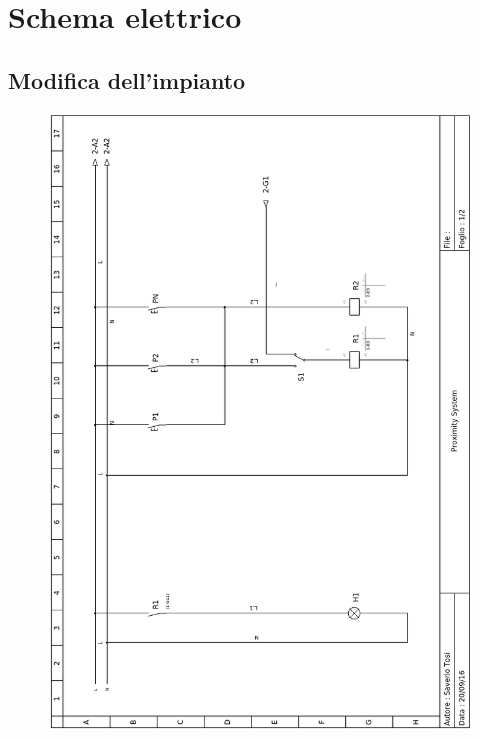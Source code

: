\chapter{Schema elettrico}
\section{Modifica dell'impianto}
\begin{figure}
\centering
\includegraphics[scale=0.57]{Immagini/schema_p1.png}
\end{figure}
